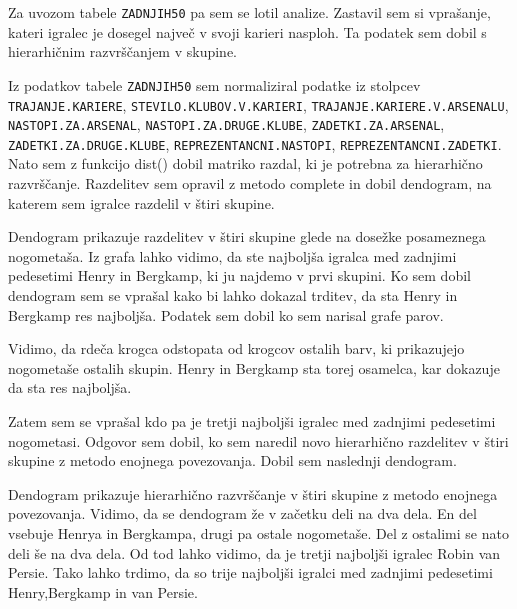 \documentclass[11pt,a4paper]{article}
\begin{document}
Za uvozom tabele \verb|ZADNJIH50| pa sem se lotil analize. Zastavil sem si vprašanje, kateri igralec je dosegel največ v svoji karieri nasploh. Ta podatek sem dobil s hierarhičnim razvrščanjem v skupine.

Iz podatkov tabele \verb|ZADNJIH50| sem normaliziral podatke iz stolpcev \verb|TRAJANJE.KARIERE|, \verb|STEVILO.KLUBOV.V.KARIERI|, \verb|TRAJANJE.KARIERE.V.ARSENALU|, \verb|NASTOPI.ZA.ARSENAL|, \verb|NASTOPI.ZA.DRUGE.KLUBE|, \verb|ZADETKI.ZA.ARSENAL|,  \verb|ZADETKI.ZA.DRUGE.KLUBE|, \verb|REPREZENTANCNI.NASTOPI|, \verb|REPREZENTANCNI.ZADETKI|. Nato sem z funkcijo dist() dobil matriko razdal, ki je potrebna za hierarhično razvrščanje. Razdelitev sem opravil z metodo complete in dobil dendogram, na katerem sem igralce razdelil v štiri skupine.


Dendogram  prikazuje razdelitev v štiri skupine glede na dosežke posameznega nogometaša.
Iz grafa lahko vidimo, da ste najboljša igralca med zadnjimi pedesetimi Henry in Bergkamp, ki ju najdemo v prvi skupini. 
\newpage
\indent Ko sem dobil dendogram sem se vprašal kako bi lahko dokazal trditev, da sta Henry in Bergkamp res najboljša. Podatek sem dobil ko sem narisal grafe parov.


Vidimo, da rdeča krogca odstopata od krogcov ostalih barv, ki prikazujejo nogometaše ostalih skupin. Henry in Bergkamp sta torej osamelca, kar dokazuje da sta res najboljša.
\newpage

Zatem sem se vprašal kdo pa je tretji najboljši igralec med zadnjimi pedesetimi nogometasi. Odgovor sem dobil, ko sem naredil novo hierarhično razdelitev v štiri skupine z metodo enojnega povezovanja. Dobil sem naslednji dendogram.


Dendogram prikazuje hierarhično razvrščanje v štiri skupine z metodo enojnega povezovanja. Vidimo, da se dendogram že v začetku deli na dva dela. En del vsebuje Henrya in Bergkampa, drugi pa ostale nogometaše. Del z ostalimi se nato deli še na dva dela. Od tod lahko vidimo, da je tretji najboljši igralec Robin van Persie. Tako lahko trdimo, da so trije najboljši igralci med zadnjimi pedesetimi Henry,Bergkamp in van Persie.
\end{document}
